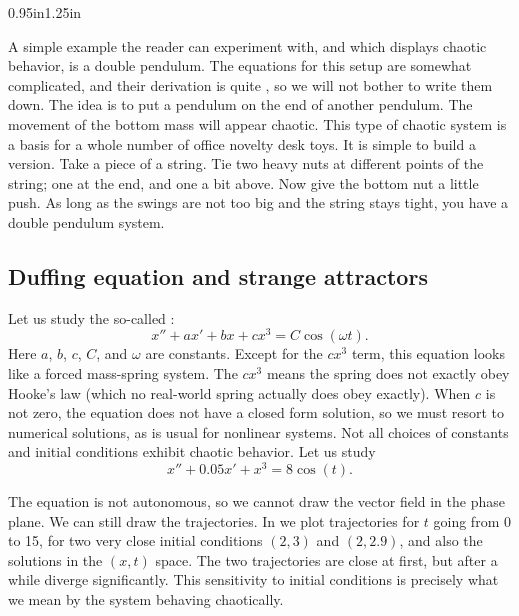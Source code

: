 \begin{mywrapfigsimp}{0.95in}{1.25in}
\noindent
{}
\end{mywrapfigsimp}
A simple example the reader can experiment with, and which displays
chaotic behavior, is a double pendulum.  The equations for this
setup are somewhat complicated, and their derivation is quite
, so we
will not bother to write them down.  The idea is to put a pendulum on the
end of another pendulum.  The movement of the bottom mass
will appear chaotic.  This type of chaotic system is a basis for a
whole number of office novelty desk toys.  It is simple to build a
version.  Take a piece of a string.  Tie two heavy nuts at different
points of the string; one at the end, and one a bit above.  Now give the
bottom nut a little push.  As long as the swings are not too big and the
string stays tight, you have a double pendulum system.

\subsection{Duffing equation and strange attractors}

Let us study the so-called \emph{}:
\begin{equation*}
x'' + a x' + bx + cx^3 = C \cos(\omega t) .
\end{equation*}
Here $a$, $b$, $c$, $C$, and $\omega$ are constants.
Except for the $c x^3$ term, this equation looks like
a forced mass-spring system.  The $c x^3$ means the spring does
not exactly obey Hooke's law (which no real-world spring actually does obey
exactly).  When $c$ is not zero, the equation does not have a closed
form solution, so we must resort to numerical solutions, as is usual for
nonlinear systems.  Not all choices of constants and initial conditions
exhibit chaotic behavior.  Let us study
\begin{equation*}
x''+0.05 x' + x^3 = 8\cos(t) .
\end{equation*}

The equation is not autonomous, so we cannot 
draw the vector field in the phase plane.
We can still draw the
trajectories.   
In  we plot trajectories for $t$ going from 0
to 15, for two very close initial conditions
$(2,3)$ and $(2,2.9)$, and also the solutions in the $(x,t)$ space.  The two
trajectories are close at first, but after a while diverge significantly.
This sensitivity to initial conditions is precisely what
we mean by the system behaving chaotically.

